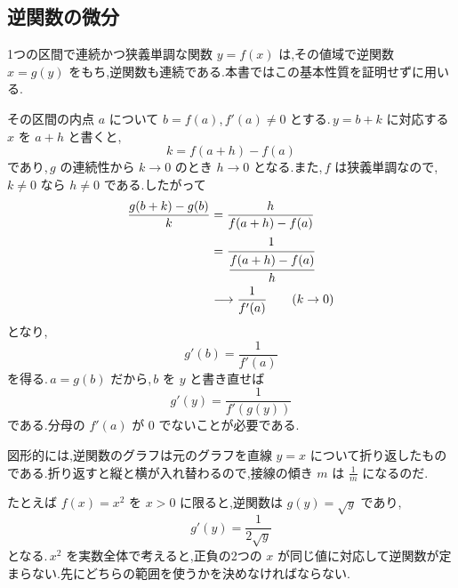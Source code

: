 \subsection{逆関数の微分}
1つの区間で連続かつ狭義単調な関数 $y=f(x)$ は,その値域で逆関数 $x=g(y)$ をもち,逆関数も連続である.本書ではこの基本性質を証明せずに用いる.

その区間の内点 $a$ について $b=f(a)$,\,$f'(a)\ne0$ とする.\,$y=b+k$ に対応する $x$ を $a+h$ と書くと,
\[
 k=f(a+h)-f(a)
\]
であり,\,$g$ の連続性から $k\to0$ のとき $h\to0$ となる.また,\,$f$ は狭義単調なので,\,$k\ne0$ なら $h\ne0$ である.したがって
\begin{align*}
 \frac{g(b+k)-g(b)}k
 &=\frac{h}{f(a+h)-f(a)}\\
 &=\cfrac{1}{\cfrac{f(a+h)-f(a)}h}\\
 &\longrightarrow\frac1{f'(a)}\qquad(k\to0)
\end{align*}
となり,
\[
 g'(b)=\frac1{f'(a)}
\]
を得る.\,$a=g(b)$ だから,\,$b$ を $y$ と書き直せば
\[
 g'(y)=\frac1{f'(g(y))}
\]
である.分母の $f'(a)$ が $0$ でないことが必要である.

図形的には,逆関数のグラフは元のグラフを直線 $y=x$ について折り返したものである.折り返すと縦と横が入れ替わるので,接線の傾き $m$ は $\frac1m$ になるのだ.

たとえば $f(x)=x^2$ を $x>0$ に限ると,逆関数は $g(y)=\sqrt y$ であり,
\[
 g'(y)=\frac1{2\sqrt y}
\]
となる.\,$x^2$ を実数全体で考えると,正負の2つの $x$ が同じ値に対応して逆関数が定まらない.先にどちらの範囲を使うかを決めなければならない.
